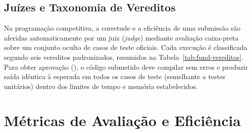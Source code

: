\subsection{Juízes e Taxonomia de Vereditos}\label{sec:fund-judge}

Na programação competitiva, a corretude e a eficiência de uma submissão são aferidas automaticamente por um juiz (\textit{judge}) mediante avaliação caixa-preta sobre um conjunto oculto de casos de teste oficiais. Cada execução é classificada segundo seis vereditos padronizados, resumidos na Tabela~\ref{tab:fund-vereditos}. Para obter aprovação (), o código submetido deve compilar sem erros e produzir saída idêntica à esperada em todos os casos de teste (semelhante a testes unitários) dentro dos limites de tempo e memória estabelecidos.

\begin{table}[!htbp]
\centering
\caption[Taxonomia de vereditos de um juiz automatizado]{Taxonomia de vereditos utilizados na avaliação automatizada de soluções.}
\label{tab:fund-vereditos}
\small
{}
\end{table}

\section{Métricas de Avaliação e Eficiência}\label{sec:fund-metricas}

